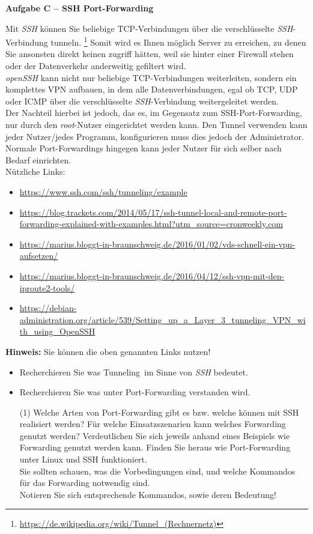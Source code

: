 \documentclass[paper=a4,fontsize=11pt]{scrartcl}%
\begin{document}
\begin{center}\Large{\textbf{Aufgabe C -- SSH Port-Forwarding}}\end{center}\vskip0.25in
Mit \emph{SSH} können Sie beliebige TCP-Verbindungen über die verschlüsselte \emph{SSH}-Verbindung \glqq tunneln\grqq. \footnote{\url{https://de.wikipedia.org/wiki/Tunnel_(Rechnernetz)}} Somit wird es Ihnen möglich Server zu erreichen, zu denen Sie ansonsten direkt keinen zugriff hätten, weil sie hinter einer Firewall stehen oder der Datenverkehr anderweitig gefiltert wird.\\
\emph{openSSH} kann nicht nur beliebige TCP-Verbindungen weiterleiten, sondern ein komplettes VPN aufbauen, in dem alle Datenverbindungen, egal ob TCP, UDP oder ICMP über die verschlüsselte \emph{SSH}-Verbindung weitergeleitet werden.\\
Der Nachteil hierbei ist jedoch, das es, im Gegensatz zum SSH-Port-Forwarding, nur durch den \emph{root}-Nutzer eingerichtet werden kann. Den Tunnel verwenden kann jeder Nutzer/jedes Programm, konfigurieren muss dies jedoch der Administrator. Normale Port-Forwardings hingegen kann jeder Nutzer für sich selber nach Bedarf einrichten.\\
Nützliche Links:
\begin{itemize}
	\item \url{https://www.ssh.com/ssh/tunneling/example}
	\item \url{https://blog.trackets.com/2014/05/17/ssh-tunnel-local-and-remote-port-forwarding-explained-with-examples.html?utm_source=cronweekly.com}
	\item \url{https://marius.bloggt-in-braunschweig.de/2016/01/02/vds-schnell-ein-vpn-aufsetzen/}
	\item \url{https://marius.bloggt-in-braunschweig.de/2016/04/12/ssh-vpn-mit-den-iproute2-tools/}
	\item \url{https://debian-administration.org/article/539/Setting_up_a_Layer_3_tunneling_VPN_with_using_OpenSSH}
\end{itemize}
\textbf{Hinweis:} Sie können die oben genannten Links nutzen!
\begin{itemize}
	\item Recherchieren Sie was \glqq Tunneling\grqq\ im Sinne von \emph{SSH}  bedeutet.
	\item Recherchieren Sie was unter Port-Forwarding verstanden wird.\\
	\begin{tasks}(1)
		\task Welche Arten von Port-Forwarding gibt es bzw. welche können mit SSH realisiert werden? Für welche Einsatzszenarien kann welches Forwarding genutzt werden?
		\task Verdeutlichen Sie sich jeweils anhand eines Beispiels wie Forwarding genutzt werden kann.
		\task Finden Sie heraus wie Port-Forwarding unter Linux und SSH funktioniert.\\
		Sie sollten schauen, was die Vorbedingungen sind, und welche Kommandos für das Forwarding notwendig sind.\\
		Notieren Sie sich entsprechende Kommandos, sowie deren Bedeutung!
	\end{tasks}
\end{itemize}
\end{document}
